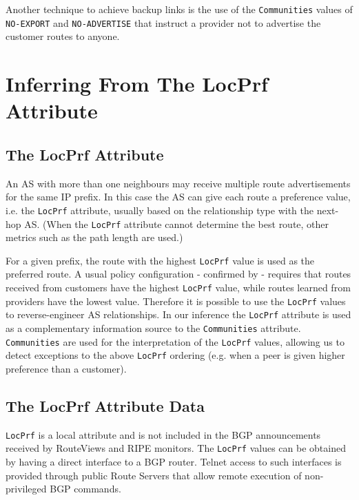 \documentclass[conference]{IEEEtran}
\begin{document}
Another technique to achieve backup links is the use of the {\tt Communities}  values of {\tt NO-EXPORT} and {\tt NO-ADVERTISE}  that instruct a provider not to advertise the customer routes to anyone. 

\section{Inferring From The {LocPrf} Attribute}
\label{subsec:locpref}

\subsection{The  {LocPrf} Attribute}

An AS with more than one neighbours may receive multiple route advertisements for the same IP prefix. In this case the AS can give each route a preference value, i.e. the {\tt LocPrf} attribute, usually based on the relationship type with the next-hop AS. 
(When the  {\tt LocPrf} attribute cannot determine the best route, other metrics such as the path length are used.)

For a given prefix, the route with the highest {\tt LocPrf} value is used as the preferred route. A usual policy configuration - confirmed by \cite{Wang:2003} - requires that routes received from customers have the highest {\tt LocPrf} value, while routes learned from providers have the lowest value.  
Therefore it is possible to use the {\tt LocPrf} values to reverse-engineer AS relationships. In our inference the {\tt LocPrf} attribute is used as a complementary information source to the  {\tt Communities}  attribute. {\tt Communities} are used for the interpretation of the {\tt LocPrf} values, allowing us to detect exceptions to the above {\tt LocPrf} ordering (e.g. when a peer is given higher preference than a customer).

\subsection{The  {LocPrf} Attribute Data}

{\tt LocPrf} is a local attribute and is not included in the BGP announcements received by RouteViews and RIPE monitors. The {\tt LocPrf} values can be obtained by having a direct interface to a BGP router. Telnet access to such interfaces is provided through public Route Servers that allow remote execution of non-privileged BGP commands.
\end{document}
